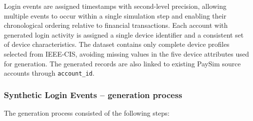 \documentclass[titlepage]{article}
\begin{document}
Login events are assigned timestamps with second-level precision, allowing multiple events to occur within a single simulation step and enabling their chronological ordering relative to financial transactions. Each account with generated login activity is assigned a single device identifier and a consistent set of device characteristics. The dataset contains only complete device profiles selected from IEEE-CIS, avoiding missing values in the five device attributes used for generation. The generated records are also linked to existing PaySim source accounts through \texttt{account\_id}.

\subsubsection{Synthetic Login Events -- generation process}
The generation process consisted of the following steps:
\end{document}
